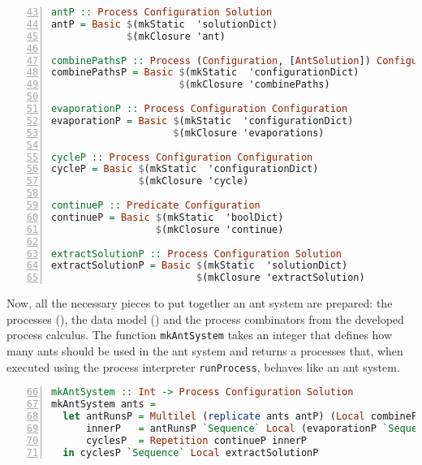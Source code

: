 \begin{lstlisting}[language=Haskell,frame=tb,numbers=left,firstnumber=43,label=lst:ant_hive,caption={Processes, built up from previously defined basic processes.}, basicstyle=\footnotesize\ttfamily]
antP :: Process Configuration Solution
antP = Basic $(mkStatic  'solutionDict) 
             $(mkClosure 'ant)

combinePathsP :: Process (Configuration, [AntSolution]) Configuration
combinePathsP = Basic $(mkStatic  'configurationDict)
                      $(mkClosure 'combinePaths)

evaporationP :: Process Configuration Configuration
evaporationP = Basic $(mkStatic  'configurationDict)
                     $(mkClosure 'evaporations)

cycleP :: Process Configuration Configuration
cycleP = Basic $(mkStatic  'configurationDict)
               $(mkClosure 'cycle)

continueP :: Predicate Configuration
continueP = Basic $(mkStatic  'boolDict)
                  $(mkClosure 'continue)

extractSolutionP :: Process Configuration Solution
extractSolutionP = Basic $(mkStatic  'solutionDict)
                         $(mkClosure 'extractSolution)
\end{lstlisting}

Now, all the necessary pieces to put together an ant system are prepared: the processes (), the data model () and the process combinators from the developed process calculus. The function \texttt{mkAntSystem} takes an integer that defines how many ants should be used in the ant system and returns a processes that, when executed using the process interpreter \texttt{runProcess}, behaves like an ant system.

\begin{lstlisting}[language=Haskell,frame=tb,numbers=left,firstnumber=66,label=lst:ant_system_complete,caption=Transformation of a configuration for an ant system into a process hierarchy., basicstyle=\footnotesize\ttfamily]
mkAntSystem :: Int -> Process Configuration Solution
mkAntSystem ants =
  let antRunsP = Multilel (replicate ants antP) (Local combinePathsP)
      innerP   = antRunsP `Sequence` Local (evaporationP `Sequence` cycleP)
      cyclesP  = Repetition continueP innerP
  in cyclesP `Sequence` Local extractSolutionP
\end{lstlisting}

